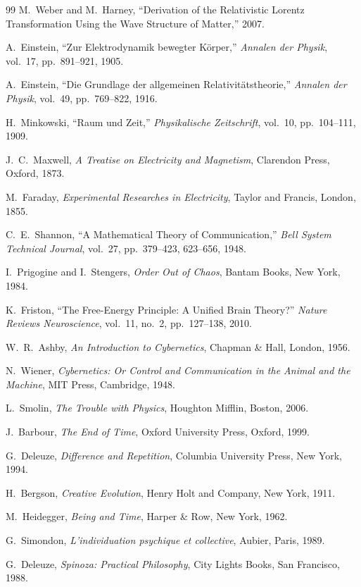\documentclass[12pt,a4paper]{article}
\begin{document}
\begin{thebibliography}{99}
M.~Weber and M.~Harney,
``Derivation of the Relativistic Lorentz Transformation Using the Wave Structure of Matter,''
2007.

A.~Einstein,
``Zur Elektrodynamik bewegter K\"orper,''
\textit{Annalen der Physik},
vol.~17,
pp.~891--921,
1905.

A.~Einstein,
``Die Grundlage der allgemeinen Relativit\"atstheorie,''
\textit{Annalen der Physik},
vol.~49,
pp.~769--822,
1916.

H.~Minkowski,
``Raum und Zeit,''
\textit{Physikalische Zeitschrift},
vol.~10,
pp.~104--111,
1909.

J.~C.~Maxwell,
\textit{A Treatise on Electricity and Magnetism},
Clarendon Press, Oxford, 1873.

M.~Faraday,
\textit{Experimental Researches in Electricity},
Taylor and Francis, London, 1855.

C.~E.~Shannon,
``A Mathematical Theory of Communication,''
\textit{Bell System Technical Journal},
vol.~27,
pp.~379--423, 623--656,
1948.

I.~Prigogine and I.~Stengers,
\textit{Order Out of Chaos},
Bantam Books, New York, 1984.

K.~Friston,
``The Free-Energy Principle: A Unified Brain Theory?''
\textit{Nature Reviews Neuroscience},
vol.~11,
no.~2,
pp.~127--138,
2010.

W.~R.~Ashby,
\textit{An Introduction to Cybernetics},
Chapman \& Hall, London, 1956.

N.~Wiener,
\textit{Cybernetics: Or Control and Communication in the Animal and the Machine},
MIT Press, Cambridge, 1948.

L.~Smolin,
\textit{The Trouble with Physics},
Houghton Mifflin, Boston, 2006.

J.~Barbour,
\textit{The End of Time},
Oxford University Press, Oxford, 1999.

G.~Deleuze,
\textit{Difference and Repetition},
Columbia University Press, New York, 1994.

H.~Bergson,
\textit{Creative Evolution},
Henry Holt and Company, New York, 1911.

M.~Heidegger,
\textit{Being and Time},
Harper \& Row, New York, 1962.

G.~Simondon,
\textit{L'individuation psychique et collective},
Aubier, Paris, 1989.

G.~Deleuze,
\textit{Spinoza: Practical Philosophy},
City Lights Books, San Francisco, 1988.

\end{thebibliography}
\end{document}
